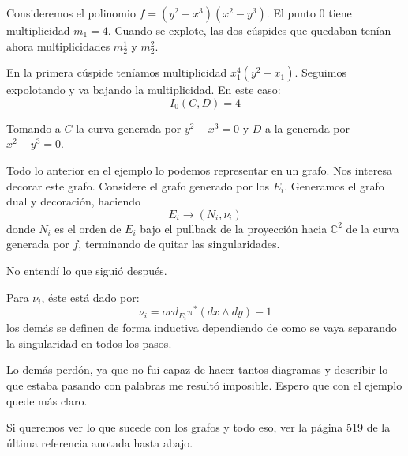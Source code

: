 \documentclass[12pt]{report}
\newcounter{it}
\theoremstyle{largebreak}
\begin{document}
    \begin{exa}
        Consideremos el polinomio $f=(y^2-x^3)(x^2-y^3)$. El punto $0$ tiene multiplicidad $m_1=4$. Cuando se explote, las dos cúspides que quedaban tenían ahora multiplicidades $m_2^1$ y $m_2^2$.

        En la primera cúspide teníamos multiplicidad $x_1^4(y^2-x_1)$. Seguimos expolotando y va bajando la multiplicidad. En este caso:
        \begin{equation*}
            I_0(C,D)=4
        \end{equation*}

        Tomando a $C$ la curva generada por $y^2-x^3=0$ y $D$ a la generada por $x^2-y^3=0$.
    \end{exa}

    Todo lo anterior en el ejemplo lo podemos representar en un grafo. Nos interesa decorar este grafo. Considere el grafo generado por los $E_i$. Generamos el grafo dual y decoración, haciendo
    \begin{equation*}
        E_i\rightarrow (N_i,\nu_i)
    \end{equation*}
    donde $N_i$ es el orden de $E_i$ bajo el pullback de la proyección hacia $\mathbb{C}^2$ de la curva generada por $f$, terminando de quitar las singularidades.

    No entendí lo que siguió después.

    Para $\nu_i$, éste está dado por:
    \begin{equation*}
        \nu_i=ord_{ E_i}\pi^{*}(dx\wedge dy)-1
    \end{equation*}
    los demás se definen de forma inductiva dependiendo de como se vaya separando la singularidad en todos los pasos.

    Lo demás perdón, ya que no fui capaz de hacer tantos diagramas y describir lo que estaba pasando con palabras me resultó imposible. Espero que con el ejemplo quede más claro.

    Si queremos ver lo que sucede con los grafos y todo eso, ver la página 519 de la última referencia anotada hasta abajo.
    
\end{document}
